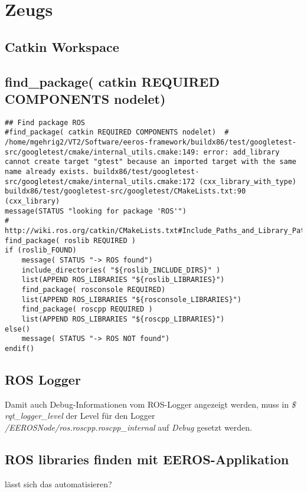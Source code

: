 \chapter{Zeugs}


\section{Catkin Workspace}




\section{find\_package( catkin REQUIRED COMPONENTS nodelet)}
\lstset{language=c}
\begin{lstlisting}
## Find package ROS
#find_package( catkin REQUIRED COMPONENTS nodelet)	# /home/mgehrig2/VT2/Software/eeros-framework/buildx86/test/googletest-src/googletest/cmake/internal_utils.cmake:149: error: add_library cannot create target "gtest" because an imported target with the same name already exists. buildx86/test/googletest-src/googletest/cmake/internal_utils.cmake:172 (cxx_library_with_type) buildx86/test/googletest-src/googletest/CMakeLists.txt:90 (cxx_library)
message(STATUS "looking for package 'ROS'")
# http://wiki.ros.org/catkin/CMakeLists.txt#Include_Paths_and_Library_Paths
find_package( roslib REQUIRED )
if (roslib_FOUND)
	message( STATUS "-> ROS found")
	include_directories( "${roslib_INCLUDE_DIRS}" )
	list(APPEND ROS_LIBRARIES "${roslib_LIBRARIES}")
	find_package( rosconsole REQUIRED)
	list(APPEND ROS_LIBRARIES "${rosconsole_LIBRARIES}")
	find_package( roscpp REQUIRED )
	list(APPEND ROS_LIBRARIES "${roscpp_LIBRARIES}")
else()
	message( STATUS "-> ROS NOT found")
endif()
\end{lstlisting}





\section{ROS Logger}
Damit auch Debug-Informationen vom ROS-Logger angezeigt werden, muss in \textit{\$ rqt\_logger\_level} der Level für den Logger \textit{/EEROSNode/ros.roscpp.roscpp\_internal} auf \textit{Debug} gesetzt werden.



\section{ROS libraries finden mit EEROS-Applikation}
lässt sich das automatisieren?